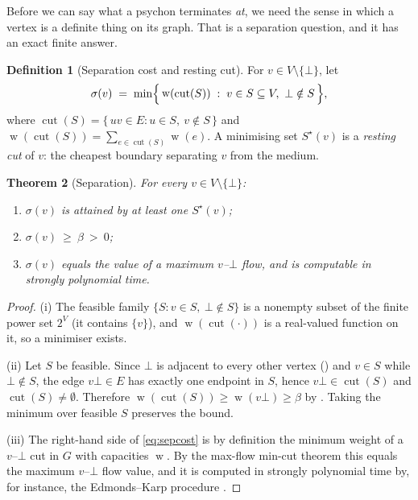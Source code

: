 \documentclass[11pt,a4paper]{article}
\theoremstyle{clstyle}
\newtheorem{theorem}{Theorem}[section]
\theoremstyle{definition}
\newtheorem{definition}[theorem]{Definition}
\theoremstyle{remark}
\DeclareMathOperator{\wt}{w}
\DeclareMathOperator{\cut}{cut}
\newcommand{\sep}{\sigma}
\newcommand{\flo}{\beta}
\newcommand{\med}{\bot}                  %
\begin{document}
Before we can say what a psychon terminates \emph{at}, we need the sense in
which a vertex is a definite thing on its graph. That is a separation
question, and it has an exact finite answer.

\begin{definition}[Separation cost and resting cut]
\label{def:sepcost}
For $v\in V\setminus\{\med\}$, let
\begin{equation}
\sep(v) \;=\; \min\Bigl\{\, \wt(\cut(S)) \;:\; v\in S \subseteq V,\ \med\notin S \,\Bigr\},
\label{eq:sepcost}
\end{equation}
where $\cut(S)=\{\,uv\in E : u\in S,\ v\notin S\,\}$ and
$\wt(\cut(S))=\sum_{e\in\cut(S)}\wt(e)$. A minimising set $S^{\star}(v)$ is a
\emph{resting cut} of $v$: the cheapest boundary separating $v$ from the
medium.
\end{definition}

\begin{theorem}[Separation]
\label{thm:separation}
For every $v\in V\setminus\{\med\}$:
\begin{enumerate}[label=(\roman*),leftmargin=2em]
\item $\sep(v)$ is attained by at least one $S^{\star}(v)$;
\item $\sep(v)\ \ge\ \flo\ >\ 0$;
\item $\sep(v)$ equals the value of a maximum $v$--$\med$ flow, and is
computable in strongly polynomial time.
\end{enumerate}
\end{theorem}

\begin{proof}
(i) The feasible family $\{S : v\in S,\ \med\notin S\}$ is a nonempty
subset of the finite power set $2^{V}$ (it contains $\{v\}$), and
$\wt(\cut(\cdot))$ is a real-valued function on it, so a minimiser exists.

(ii) Let $S$ be feasible. Since $\med$ is adjacent to every other vertex
() and $v\in S$ while $\med\notin S$, the edge
$v\med\in E$ has exactly one endpoint in $S$, hence $v\med\in\cut(S)$ and
$\cut(S)\neq\emptyset$. Therefore
$\wt(\cut(S))\ge \wt(v\med)\ge\flo$ by . Taking the minimum
over feasible $S$ preserves the bound.

(iii) The right-hand side of \eqref{eq:sepcost} is by definition the minimum
weight of a $v$--$\med$ cut in $G$ with capacities $\wt$. By the max-flow
min-cut theorem \citep{fordfulkerson1956maximal} this equals the maximum
$v$--$\med$ flow value, and it is computed in strongly polynomial time by,
for instance, the Edmonds--Karp procedure \citep{edmondskarp1972theoretical}.
\end{proof}
\end{document}
